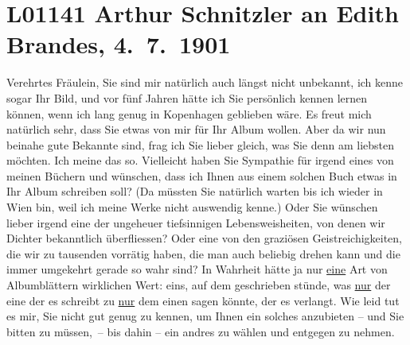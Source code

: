 

\section[Arthur Schnitzler an Edith Brandes, 4. 7. 1901]{L01141 Arthur Schnitzler an Edith Brandes, 4. 7. 1901}
\nopagebreak{}
\rehead{ }\normalsize\beginnumbering{}
\toendnotes[C]{\smallbreak\pagebreak[2]}
\toendnotes[C]{\smallbreak}
\pstart{}{\pb}Verehrtes Fräulein,\pend\vspace{0.5em}
\pstart
           Sie sind mir natürlich auch längst nicht unbekannt, ich kenne sogar Ihr Bild, und vor
               fünf Jahren hätte ich Sie persönlich kennen lernen können, wenn ich lang genug in Kopenhagen geblieben wäre. Es freut mich
               natürlich sehr, dass Sie etwas von mir für Ihr Album wollen. Aber da wir nun beinahe
               gute Bekannte sind, frag ich Sie lieber gleich, was Sie denn am liebsten möchten. Ich
               meine das so. Vielleicht haben Sie Sympathie für irgend eines von meinen Büchern und
               wünschen, dass ich Ihnen aus einem solchen Buch etwas in Ihr Album schreiben soll?
               (Da müssten Sie natürlich warten bis ich wieder in Wien bin, weil ich meine Werke nicht auswendig kenne.) Oder Sie wünschen
               lieber irgend eine der ungeheuer tiefsinnigen Lebensweisheiten, von denen wir Dichter
               bekanntlich überfliessen? Oder eine von den graziösen Geistreichigkeiten, die wir zu
               tausenden vorrätig haben, die man auch beliebig drehen kann und die immer umgekehrt
               gerade so wahr sind? In Wahrheit hätte ja nur \uline{eine}
               Art von Albumblättern wirklichen Wert: eins, auf dem geschrieben stünde, was \uline{nur} der eine der es schreibt zu \uline{nur} dem einen sagen könnte, der es verlangt. Wie leid tut es mir, Sie
               nicht gut genug zu kennen, um Ihnen ein solches anzubieten – und Sie bitten zu
               müssen, – bis dahin – ein andres zu wählen und entgegen zu nehmen.\pend
           
